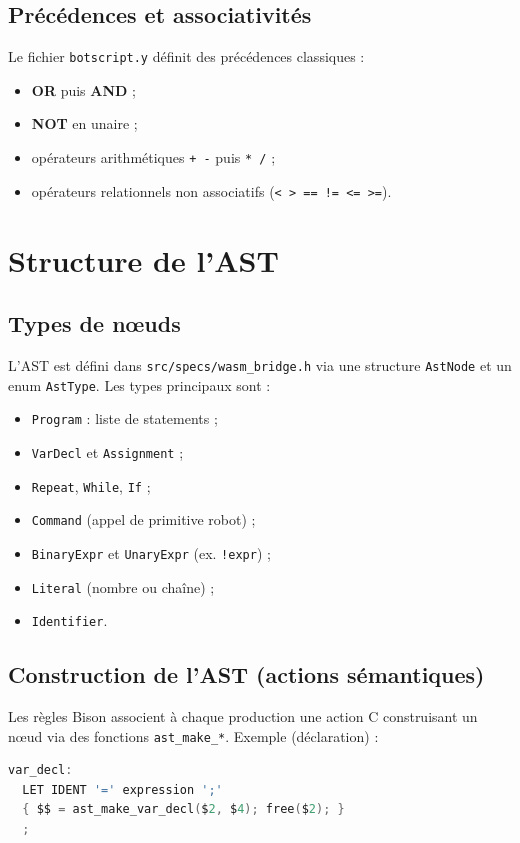 \documentclass[11pt,a4paper]{article}
\begin{document}
\subsection{Précédences et associativités}
Le fichier \texttt{botscript.y} définit des précédences classiques :
\begin{itemize}
  \item \textbf{OR} puis \textbf{AND} ;
  \item \textbf{NOT} en unaire ;
  \item opérateurs arithmétiques \texttt{+ -} puis \texttt{* /} ;
  \item opérateurs relationnels non associatifs (\texttt{< > == != <= >=}).
\end{itemize}

\section{Structure de l'AST}
\subsection{Types de n\oe{}uds}
L'AST est défini dans \texttt{src/specs/wasm\_bridge.h} via une structure \texttt{AstNode} et un enum \texttt{AstType}. Les types principaux sont :
\begin{itemize}
  \item \texttt{Program} : liste de statements ;
  \item \texttt{VarDecl} et \texttt{Assignment} ;
  \item \texttt{Repeat}, \texttt{While}, \texttt{If} ;
  \item \texttt{Command} (appel de primitive robot) ;
  \item \texttt{BinaryExpr} et \texttt{UnaryExpr} (ex. \texttt{!expr}) ;
  \item \texttt{Literal} (nombre ou chaîne) ;
  \item \texttt{Identifier}.
\end{itemize}

\subsection{Construction de l'AST (actions sémantiques)}
Les règles Bison associent à chaque production une action C construisant un n\oe{}ud via des fonctions \texttt{ast\_make\_*}. Exemple (déclaration) :
\begin{lstlisting}[language=C,caption={Action Bison typique pour une déclaration}]
var_decl:
  LET IDENT '=' expression ';'
  { $$ = ast_make_var_decl($2, $4); free($2); }
  ;
\end{lstlisting}
\end{document}
